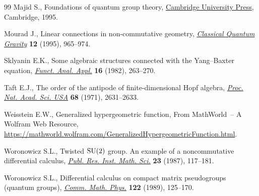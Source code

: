 \documentclass[pdftex]{sigma}
\numberwithin{equation}{section}
\newcommand{\<}{\langle}
\renewcommand{\>}{\rangle}
\begin{document}
\begin{thebibliography}{99}
Majid S., Foundations of quantum group theory, \href{https://doi.org/10.1017/CBO9780511613104}{Cambridge University Press},
 Cambridge, 1995.

Mourad J., Linear connections in non-commutative geometry, \href{https://doi.org/10.1088/0264-9381/12/4/007}{\textit{Classical
 Quantum Gravity}} \textbf{12} (1995), 965--974.

Sklyanin E.K., Some algebraic structures connected with the {Y}ang--{B}axter
 equation, \href{https://doi.org/10.1007/BF01077848}{\textit{Funct. Anal. Appl.}} \textbf{16} (1982), 263--270.

Taft E.J., The order of the antipode of finite-dimensional {H}opf algebra,
 \href{https://doi.org/10.1073/pnas.68.11.2631}{\textit{Proc. Nat. Acad. Sci. USA}} \textbf{68} (1971), 2631--2633.

Weisstein E.W., Generalized hypergeometric function, {F}rom MathWorld~-- A
 Wolfram Web Resource,
 \url{https://mathworld.wolfram.com/GeneralizedHypergeometricFunction.html}.

Woronowicz S.L., Twisted {${\rm SU}(2)$} group. {A}n example of a
 noncommutative differential calculus, \href{https://doi.org/10.2977/prims/1195176848}{\textit{Publ. Res. Inst. Math. Sci.}}
 \textbf{23} (1987), 117--181.

Woronowicz S.L., Differential calculus on compact matrix pseudogroups (quantum
 groups), \href{https://doi.org/10.1007/BF01221411}{\textit{Comm. Math. Phys.}} \textbf{122} (1989), 125--170.

\end{thebibliography}\LastPageEnding
\end{document}

